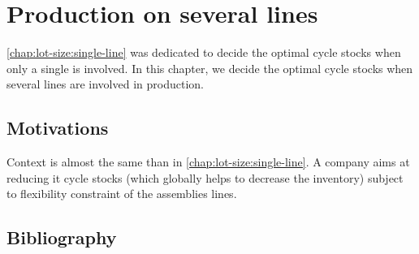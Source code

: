 \chapter{Production on several lines}
\label{chap:lot-size:several-lines}



\cref{chap:lot-size:single-line} was dedicated to decide the optimal cycle stocks when only a single is involved.
In this chapter, we decide the optimal cycle stocks when several lines are involved in production.



\section{Motivations}
\label{sec:lot-size:several-lines:motivations}


Context is almost the same than in \cref{chap:lot-size:single-line}.
A company aims at reducing it cycle stocks (which globally helps to decrease the inventory) subject to flexibility constraint of the assemblies lines.















\section{Bibliography}

